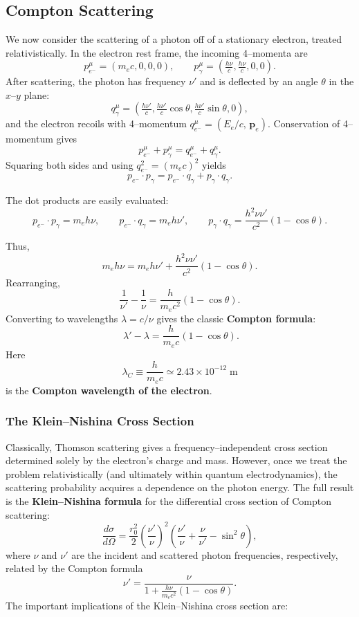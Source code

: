\subsection{Compton Scattering}

We now consider the scattering of a photon off of a stationary electron,
treated relativistically.  In the electron rest frame, the incoming
4--momenta are
\[
    p_{e^-}^\mu = (m_e c, 0,0,0), \qquad
    p_\gamma^\mu = \left(\tfrac{h\nu}{c}, \tfrac{h\nu}{c}, 0,0\right).
\]
After scattering, the photon has frequency $\nu'$ and is deflected by an
angle $\theta$ in the $x$--$y$ plane:
\[
    q_\gamma^\mu = \left(\tfrac{h\nu'}{c}, \tfrac{h\nu'}{c}\cos\theta,
                        \tfrac{h\nu'}{c}\sin\theta, 0\right),
\]
and the electron recoils with 4--momentum
$q_{e^-}^\mu = (E_e/c,\,\mathbf{p}_e)$.
Conservation of 4--momentum gives
\[
    p_{e^-}^\mu + p_\gamma^\mu = q_{e^-}^\mu + q_\gamma^\mu.
\]
Squaring both sides and using $q_{e^-}^2 = (m_e c)^2$ yields
\[
    p_{e^-}\cdot p_\gamma = p_{e^-}\cdot q_\gamma + p_\gamma\cdot q_\gamma.
\]

The dot products are easily evaluated:
\[
    p_{e^-}\cdot p_\gamma = m_e h\nu, \qquad
    p_{e^-}\cdot q_\gamma = m_e h\nu', \qquad
    p_\gamma\cdot q_\gamma = \frac{h^2\nu\nu'}{c^2}(1-\cos\theta).
\]

Thus,
\[
    m_e h\nu = m_e h\nu' + \frac{h^2\nu\nu'}{c^2}(1-\cos\theta).
\]
Rearranging,
\[
    \frac{1}{\nu'} - \frac{1}{\nu} = \frac{h}{m_e c^2}(1-\cos\theta).
\]
Converting to wavelengths $\lambda = c/\nu$ gives the classic
\textbf{Compton formula}:
\begin{equation}
    \boxed{\;\;\lambda' - \lambda = \frac{h}{m_e c}(1-\cos\theta). \;}
\end{equation}
Here
\[
    \lambda_C \equiv \frac{h}{m_e c} \simeq 2.43\times 10^{-12}\;\mathrm{m}
\]
is the \textbf{Compton wavelength of the electron}.

\subsubsection{The Klein--Nishina Cross Section}

Classically, Thomson scattering gives a frequency--independent cross
section determined solely by the electron’s charge and mass. However,
once we treat the problem relativistically (and ultimately within
quantum electrodynamics), the scattering probability acquires a
dependence on the photon energy. The full result is the
\textbf{Klein--Nishina formula} for the differential cross section of
Compton scattering:
\begin{equation}
    \label{eq:klein_nishina}
    \boxed{
    \frac{d\sigma}{d\Omega} =
    \frac{r_0^2}{2}
    \left(\frac{\nu'}{\nu}\right)^2
    \left(
        \frac{\nu'}{\nu} + \frac{\nu}{\nu'} - \sin^2\theta
    \right),}
\end{equation}
where $\nu$ and $\nu'$ are the incident and scattered photon
frequencies, respectively, related by the Compton formula
\[
    \nu' = \frac{\nu}{1 + \tfrac{h\nu}{m_e c^2}(1-\cos\theta)}.
\]
The important implications of the Klein--Nishina cross section are:

